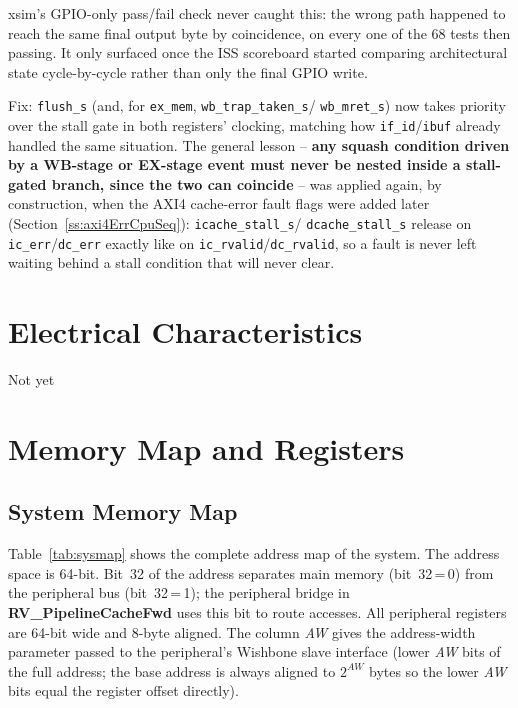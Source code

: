 xsim's GPIO-only pass/fail check never caught this: the wrong path
happened to reach the same final output byte by coincidence, on every one
of the 68 tests then passing. It only surfaced once the ISS scoreboard
started comparing architectural state cycle-by-cycle rather than only the
final GPIO write.

Fix: \texttt{flush\_s} (and, for \texttt{ex\_mem}, \texttt{wb\_trap\_taken\_s}/
\texttt{wb\_mret\_s}) now takes priority over the stall gate in both
registers' clocking, matching how \texttt{if\_id}/\texttt{ibuf} already
handled the same situation. The general lesson -- \textbf{any squash
condition driven by a WB-stage or EX-stage event must never be nested
inside a stall-gated branch, since the two can coincide} -- was applied
again, by construction, when the AXI4 cache-error fault flags were added
later (Section~\ref{ss:axi4ErrCpuSeq}): \texttt{icache\_stall\_s}/
\texttt{dcache\_stall\_s} release on \texttt{ic\_err}/\texttt{dc\_err}
exactly like on \texttt{ic\_rvalid}/\texttt{dc\_rvalid}, so a fault is
never left waiting behind a stall condition that will never clear.

\chapter{Electrical Characteristics}
Not yet

\chapter{Memory Map and Registers}
\label{ch:memmap}

\section{System Memory Map}
\label{sec:sysmap}

Table~\ref{tab:sysmap} shows the complete address map of the \aschip{} system.
The address space is 64-bit.
Bit~32 of the address separates main memory (bit~32\,=\,0) from the peripheral
bus (bit~32\,=\,1); the peripheral bridge in \textbf{RV\_PipelineCacheFwd} uses
this bit to route accesses.
All peripheral registers are 64-bit wide and 8-byte aligned.
The column \textit{AW} gives the address-width parameter passed to the
peripheral's Wishbone slave interface (lower \textit{AW} bits of the full
address; the base address is always aligned to $2^{AW}$ bytes so the lower
\textit{AW} bits equal the register offset directly).

